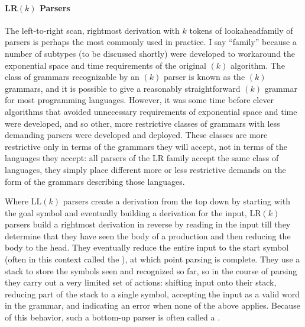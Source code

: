 \paragraph{LR$(k)$ Parsers}
The \empause left-to-right scan, rightmost derivation with $k$ tokens of lookahead\empause family of parsers is perhaps the most commonly used in practice. I say ``family'' because a number of subtypes (to be discussed shortly) were developed to workaround the exponential space and time requirements of the original $(k)$ algorithm. The class of grammars recognizable by an $(k)$ parser is known as the $(k)$ grammars, and it is possible to give a reasonably straightforward $(k)$ grammar for most programming languages. However, it was some time before clever algorithms that avoided unnecessary requirements of exponential space and time were developed, and so other, more restrictive classes of grammars with less demanding parsers were developed and deployed. These classes are more restrictive only in terms of the grammars they will accept, not in terms of the languages they accept: all parsers of the LR family accept the same class of languages, they simply place different more or less restrictive demands on the form of the grammars describing those languages.

Where LL$(k)$ parsers create a derivation from the top down by starting with the goal symbol and eventually building a derivation for the input, LR$(k)$ parsers build a rightmost derivation in reverse by reading in the input till they determine that they have seen the body of a production and then reducing the body to the head. They eventually reduce the entire input to the start symbol (often in this context called the ), at which point parsing is complete. They use a stack to store the symbols seen and recognized so far, so in the course of parsing they carry out a very limited set of actions: shifting input onto their stack, reducing part of the stack to a single symbol, accepting the input as a valid word in the grammar, and indicating an error when none of the above applies. Because of this behavior, such a bottom-up parser is often called a .

